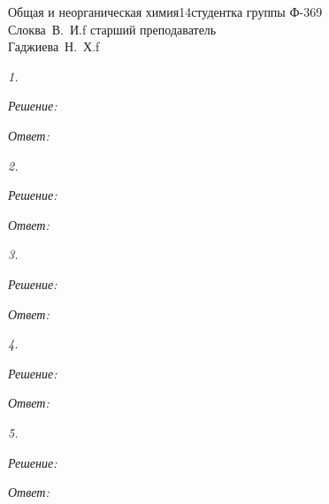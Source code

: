 






{Общая и неорганическая химия}{}{14}{студентка группы Ф-369\\Слоква~В.~И.}{f}
{старший преподаватель\\Гаджиева~Н.~Х.}{f}


\emph{1. }

\vspace*{2em}
\emph{Решение:}

\vspace*{2em}
\emph{Ответ: }

\newpage %

\emph{2. }

\vspace*{2em}
\emph{Решение:}

\vspace*{2em}
\emph{Ответ: }

\newpage %

\emph{3. }

\vspace*{2em}
\emph{Решение:}

\vspace*{2em}
\emph{Ответ: }

\newpage %

\emph{4. }

\vspace*{2em}
\emph{Решение:}

\vspace*{2em}
\emph{Ответ: }

\newpage %

\emph{5. }

\vspace*{2em}
\emph{Решение:}

\vspace*{2em}
\emph{Ответ: }

\newpage %

